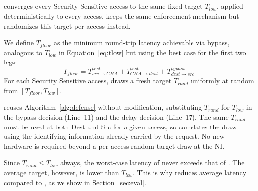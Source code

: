 \subsection{\rscheme} \label{sec-rscheme}
\bscheme{} converges every Security Sensitive access to the same fixed target $T_{low}$, applied deterministically to every access.
\rscheme{} keeps the same enforcement mechanism but randomizes this target per access instead.

We define $T_{floor}$ as the minimum round-trip latency achievable via bypass, analogous to $T_{low}$ in Equation~\ref{eq:tlow} but using the best case for the first two legs:
\begin{equation}
\label{eq:tfloor}
T_{floor} = T_{src \to CHA}^{best} +
            T_{CHA \to dest}^{best} +
            T_{dest \to src}^{bypass}
\end{equation}
For each Security Sensitive access, \rscheme{} draws a fresh target $T_{rand}$ uniformly at random from $[T_{floor}, T_{low}]$.

\rscheme{} reuses Algorithm~\ref{alg:defense} without modification, substituting $T_{rand}$ for $T_{low}$ in the bypass decision (Line~11) and the delay decision (Line~17).
The same $T_{rand}$ must be used at both Dest and Src for a given access, so \rscheme{} correlates the draw using the identifying information already carried by the request.
No new hardware is required beyond a per-access random target draw at the NI.

Since $T_{rand} \le T_{low}$ always, the worst-case latency of \rscheme{} never exceeds that of \bscheme{}.
The average target, however, is lower than $T_{low}$.
This is why \rscheme{} reduces average latency compared to \bscheme{}, as we show in Section~\ref{sec:eval}.

